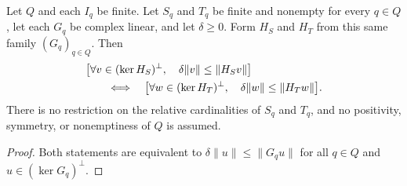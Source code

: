 \begin{lemma}
    \label{thm:mpo_dependent_spectator_replacement}
    \leanok
    Let $Q$ and each $I_q$ be finite.  Let $S_q$ and $T_q$ be finite and
    nonempty for every $q\in Q$, let each $G_q$ be complex linear, and let
    $\delta\geq0$.  Form $H_S$ and $H_T$ from this same family $(G_q)_{q\in Q}$.
    Then
    \begin{align}
         & \bigl[\forall v\in(\ker H_S)^\perp,\quad
        \delta\|v\|\leq\|H_Sv\|\bigr]\notag         \\
         & \qquad\Longleftrightarrow\quad
        \bigl[\forall w\in(\ker H_T)^\perp,\quad
            \delta\|w\|\leq\|H_Tw\|\bigr].
    \end{align}
    There is no restriction on the relative cardinalities of $S_q$ and $T_q$,
    and no positivity, symmetry, or nonemptiness of $Q$ is assumed.
\end{lemma}
\begin{proof}
    \leanok
    Both statements are equivalent to
    $\delta\|u\|\leq\|G_qu\|$ for all $q\in Q$ and
    $u\in(\ker G_q)^\perp$.
\end{proof}

